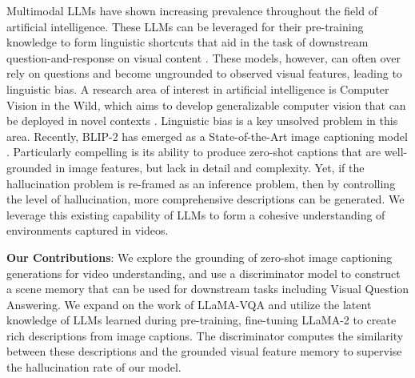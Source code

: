\documentclass[conference]{IEEEtran}
\begin{document}
Multimodal LLMs have shown increasing prevalence throughout the field of artificial intelligence. These LLMs can be leveraged for their pre-training knowledge to form linguistic shortcuts that aid in the task of downstream question-and-response on visual content \cite{ko2023large}. These models, however, can often over rely on questions and become ungrounded to observed visual features, leading to linguistic bias. A research area of interest in artificial intelligence is Computer Vision in the Wild, which aims to develop generalizable computer vision that can be deployed in novel contexts \cite{li2022elevater}. Linguistic bias is a key unsolved problem in this area. Recently, BLIP-2 has emerged as a State-of-the-Art image captioning model \cite{li2023blip2}. Particularly compelling is its ability to produce zero-shot captions that are well-grounded in image features, but lack in detail and complexity. Yet, if the hallucination problem is re-framed as an inference problem, then by controlling the level of hallucination, more comprehensive descriptions can be generated. We leverage this existing capability of LLMs to form a cohesive understanding of environments captured in videos.

\textbf{Our Contributions}: We explore the grounding of zero-shot image captioning generations for video understanding, and use a discriminator model to construct a scene memory that can be used for downstream tasks including Visual Question Answering. We expand on the work of LLaMA-VQA \cite{ko2023large} and utilize the latent knowledge of LLMs learned during pre-training, fine-tuning LLaMA-2 to create rich descriptions from image captions. The discriminator computes the similarity between these descriptions and the grounded visual feature memory to supervise the hallucination rate of our model.
\end{document}
